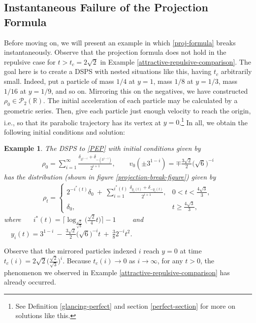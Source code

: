 \documentclass[11pt]{article}
\newtheorem{example}[theorem]{Example}
\numberwithin{equation}{section}
\begin{document}
    \subsection{Instantaneous Failure of the Projection Formula}
        Before moving on, we will present an example in which \eqref{proj-formula} breaks instantaneously. Observe that the projection formula does not hold in the repulsive case for $t>t_c=2\sqrt{2}$ in Example \ref{attractive-repulsive-comparison}. The goal here is to create a DSPS with nested situations like this, having $t_c$ arbitrarily small. Indeed, put a particle of mass $1/4$ at $y=1$, mass $1/8$ at $y=1/3$, mass $1/16$ at $y=1/9$, and so on. Mirroring this on the negatives, we have constructed $\rho_0\in\mathcal{P}_2(\mathbb{R})$. The initial acceleration of each particle may be calculated by a geometric series. Then, give each particle just enough velocity to reach the origin, i.e., so that its parabolic trajectory has its vertex at $y=0$.\footnote{See Definition \ref{glancing-perfect} and section \ref{perfect-section} for more on solutions like this.} In all, we obtain the following initial conditions and solution: 
        \begin{example}\label{breaks-instantaneous}
            The DSPS to \eqref{PEP} with initial conditions given by
            \begin{align*}
                \rho_0=\sum_{i=1}^\infty\frac{\delta_{3^{1-i}}+\delta_{-(3^{1-i})}}{2^{i+1}}, \quad\quad v_0(\pm3^{1-i})=\mp\frac{3\sqrt{2}}{2}\big(\sqrt{6}\big)^{-i}
            \end{align*}
            has the distribution (shown in figure \ref{projection-break-figure}) given by 
            \begin{align*}
                \rho_t=\begin{cases}
                    \displaystyle 2^{-i^*(t)}\delta_0\ +\ \sum_{i=1}^{i^*(t)}\frac{\delta_{y_i(t)}+\delta_{-y_i(t)}}{2^{i+1}}, & 0<t<\frac{4\sqrt{3}}{3},
                    \\
                    \delta_0, & t\geq\frac{4\sqrt{3}}{3},
                \end{cases} 
            \end{align*}
            where $\ \ \quad \displaystyle i^*(t)=\bigg\lceil\log_{\frac{\sqrt2}{\sqrt3}}\big(\frac{\sqrt2}{4}t\big)\bigg\rceil-1 \quad$ \ \ and \ \  $\quad\displaystyle y_i(t)=3^{1-i}\ -\ \frac{3\sqrt{2}}{2}\big(\sqrt{6}\big)^{-i}t\ +\ \frac{3}{8}2^{-i}t^2$.
        \end{example}
        Observe that the mirrored particles indexed $i$ reach $y=0$ at time $t_c(i)=2\sqrt{2}\Big(\frac{\sqrt2}{\sqrt3}\Big)^i$. Because $t_c(i)\to0$ as $i\to\infty$, for any $t>0$, the phenomenon we observed in Example \ref{attractive-repulsive-comparison} has already occurred. 
\end{document}
